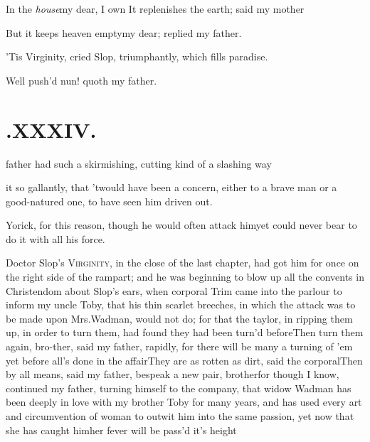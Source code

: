\documentclass[twoside]{article}
\begin{document}
\tsh In the \textit{house}\tsk my dear, I
own\tsk \break
\null\tsh It replenishes the earth; said my
mother\tsh

But it keeps heaven empty\tsk my dear; replied my father.
\egroup

\etp{}
\eject
\tsk ’Tis Virginity, cried Slop,
triumphantly, which fills paradise.

Well push’d nun! quoth my father.

\section{.\enspace XXXIV.}

 father had such a skirmishing, cutting kind of a slashing way 

\noindent
{}
 it so gallantly,
that ’twould have been a concern, either to a brave man or
a\break
good-natured one, to have seen him\break
driven out.

Yorick, for this reason, though he would often attack
him\tsk yet could never bear to do it with all his force.

Doctor Slop’s \textsc{Virginity}, in the
close of the last chapter, had got him for once on the right side
of the rampart; and he was beginning to blow up all the convents in
Christendom about Slop’s ears, when corporal
Trim came into the parlour to inform my uncle Toby,
that his thin scarlet breeches, in which the attack was to be made
upon Mrs.\@ Wadman, would not do; for that the taylor, in
ripping them up, in order to turn them, had found they had been
turn’d before\tsh Then turn them again, bro-\break ther,
said my father, rapidly, for there will be many a turning of
’em yet before all’s done in the
affair\tsh They are as rotten as dirt, said the
corporal\tsh\break Then by all means, said my father, bespeak a
new pair, brother\tsh for though I know, continued my
father, turning himself to the company, that widow Wadman
has been deeply in love with my brother Toby for many years,
and has used every art and circumvention of woman to outwit him
into the same passion, yet now that she has caught
him\tsh her fever will be pass’d it’s\sic\break
height\tsh
\end{document}
